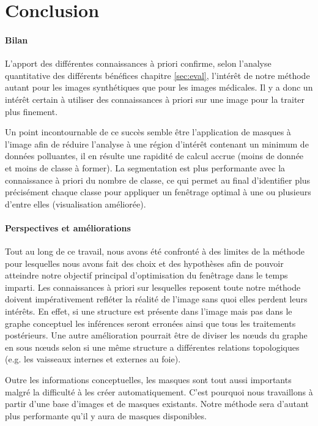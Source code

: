 \chapter{Conclusion}
	\subsubsection*{Bilan}
	L'apport des différentes connaissances à priori confirme, selon l'analyse quantitative des différents bénéfices chapitre  \ref{sec:eval}, l'intérêt de notre méthode autant pour les images synthétiques que pour les images médicales. Il y a donc un intérêt certain à utiliser des connaissances à priori sur une image pour la traiter plus finement.
	
	Un point incontournable de ce succès semble être l'application de masques à l'image afin de réduire l'analyse à une région d'intérêt contenant un minimum de données polluantes, il en résulte une rapidité de calcul accrue (moins de donnée et moins de classe à former). La segmentation est plus performante avec la connaissance à priori du nombre de classe, ce qui permet au final d'identifier plus précisément chaque classe pour appliquer un fenêtrage optimal à une ou plusieurs d'entre elles (visualisation améliorée). 




	\subsubsection*{Perspectives et améliorations}
	Tout au long de ce travail, nous avons été confronté à des limites de la méthode pour lesquelles nous avons fait des choix et des hypothèses afin de pouvoir atteindre notre objectif principal d'optimisation du fenêtrage dans le temps imparti.
	Les connaissances à priori sur lesquelles reposent toute notre méthode doivent impérativement refléter la réalité de l'image sans quoi elles perdent leurs intérêts. En effet, si une structure est présente dans l'image mais pas dans le graphe conceptuel les inférences seront erronées ainsi que tous les traitements postérieurs. Une autre amélioration pourrait être de diviser les n\oe{}uds du graphe en sous n\oe{}uds selon si une même structure a différentes relations topologiques (e.g. les vaisseaux internes et externes au foie).
	
	Outre les informations conceptuelles, les masques sont tout aussi importants malgré la difficulté à les créer automatiquement. C'est pourquoi nous travaillons à partir d'une base d'images et de masques existants. Notre méthode sera d'autant plus performante qu'il y aura de masques disponibles.

